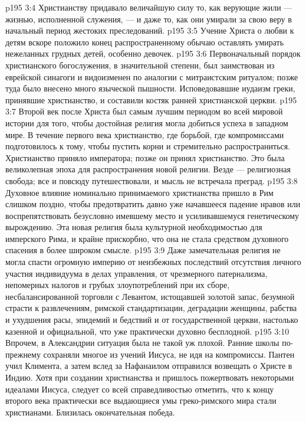 \vs p195 3:4 \pc Христианству придавало величайшую силу то, как верующие жили --- жизнью, исполненной служения, --- и даже то, как они умирали за свою веру в начальный период жестоких преследований.
\vs p195 3:5 \pc Учение Христа о любви к детям вскоре положило конец распространенному обычаю оставлять умирать нежеланных грудных детей, особенно девочек.
\vs p195 3:6 \pc Первоначальный порядок христианского богослужения, в значительной степени, был заимствован из еврейской синагоги и видоизменен по аналогии с митраистским ритуалом; позже туда было внесено много языческой пышности. Исповедовавшие иудаизм греки, принявшие христианство, и составили костяк ранней христианской церкви.
\vs p195 3:7 \pc Второй век после Христа был самым лучшим периодом во всей мировой истории для того, чтобы достойная религия могла добиться успеха в западном мире. В течение первого века христианство, где борьбой, где компромиссами подготовилось к тому, чтобы пустить корни и стремительно распространиться. Христианство приняло императора; позже он принял христианство. Это была великолепная эпоха для распространения новой религии. Везде --- религиозная свобода; все и повсюду путешествовали, и мысль не встречала преград.
\vs p195 3:8 Духовное влияние номинально принимаемого христианства пришло в Рим слишком поздно, чтобы предотвратить давно уже начавшееся падение нравов или воспрепятствовать безусловно имевшему место и усиливавшемуся генетическому вырождению. Эта новая религия была культурной необходимостью для имперского Рима, и крайне прискорбно, что она не стала средством духовного спасения в более широком смысле.
\vs p195 3:9 Даже замечательная религия не могла спасти огромную империю от неизбежных последствий отсутствия личного участия индивидуума в делах управления, от чрезмерного патернализма, непомерных налогов и грубых злоупотреблений при их сборе, несбалансированной торговли с Левантом, истощавшей золотой запас, безумной страсти к развлечениям, римской стандартизации, деградации женщины, рабства и ухудшения расы, эпидемий и бедствий и от государственной церкви, настолько казенной и официальной, что уже практически духовно бесплодной.
\vs p195 3:10 Впрочем, в Александрии ситуация была не такой уж плохой. Ранние школы по\hyp{}прежнему сохраняли многое из учений Иисуса, не идя на компромиссы. Пантен учил Климента, а затем вслед за Нафанаилом отправился возвещать о Христе в Индию. Хотя при создании христианства и пришлось пожертвовать некоторыми идеалами Иисуса, следует со всей справедливостью отметить, что к концу второго века практически все выдающиеся умы греко\hyp{}римского мира стали христианами. Близилась окончательная победа.
